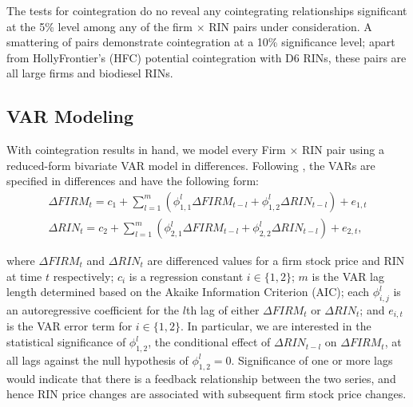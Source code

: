 \documentclass[11pt]{article}
\begin{document}
The tests for cointegration do no reveal any cointegrating relationships significant at the 5\% level among any of the firm $\times$ RIN pairs under consideration. A smattering of pairs demonstrate cointegration at a 10\% significance level; apart from HollyFrontier's (HFC) potential cointegration with D6 RINs, these pairs are all large firms and biodiesel RINs.

\subsection{VAR Modeling}

With cointegration results in hand, we model every Firm $\times$ RIN pair using a reduced-form bivariate VAR model in differences. Following \cite{Sims1980}, the VARs are specified in differences and have the following form:
\begin{equation}
\label{var}
\begin{split}
\Delta FIRM_t=c_1+\sum_{l=1}^m (\phi_{1,1}^l\Delta FIRM_{t-l}+\phi_{1,2}^l\Delta RIN_{t-l})+e_{1,t}
\\
\Delta RIN_t=c_2+\sum_{l=1}^m (\phi_{2,1}^l\Delta FIRM_{t-l}+\phi_{2,2}^l\Delta RIN_{t-l})+e_{2,t},
\end{split}
\end{equation}

\noindent where $\Delta FIRM_t$ and $\Delta RIN_t$ are differenced values for a firm stock price and RIN at time $t$ respectively; $c_i$ is a regression constant $i\in\{1,2\}$; $m$ is the VAR lag length determined based on the Akaike Information Criterion (AIC); each $\phi_{i,j}^l$ is an autoregressive coefficient for the $l$th lag of either $\Delta FIRM_t$ or $\Delta RIN_t$; and $e_{i,t}$ is the VAR error term for $i\in\{1,2\}$. In particular, we are interested in the statistical significance of $\phi_{1,2}^l$, the conditional effect of $\Delta RIN_{t-l}$ on $\Delta FIRM_t$, at all lags against the null hypothesis of $\phi_{1,2}^l=0$. Significance of one or more lags would indicate that there is a feedback relationship between the two series, and hence RIN price changes are associated with subsequent firm stock price changes. 
\end{document}
